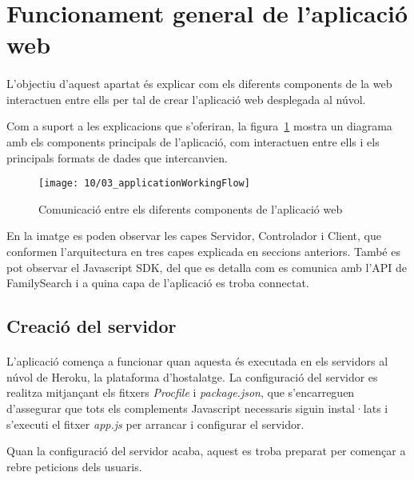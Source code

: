 \section{Funcionament general de l'aplicació web}

    \paragraph{}
    L'objectiu d'aquest apartat és explicar com els diferents components de la web interactuen entre ells per tal de crear l'aplicació web desplegada al núvol.

    Com a suport a les explicacions que s'oferiran, la figura~\ref{img:appWorkflow} mostra un diagrama amb els components principals de l'aplicació, com interactuen entre ells i els principals formats de dades que intercanvien.

    \begin{figure}
        \texttt{[image: 10/03\_applicationWorkingFlow]}
        \centering
        \caption{Comunicació entre els diferents components de l'aplicació web}\label{img:appWorkflow}
    \end{figure}

    En la imatge es poden observar les capes Servidor, Controlador i Client, que conformen l'arquitectura en tres capes explicada en seccions anteriors. També es pot observar el Javascript SDK, del que es detalla com es comunica amb l'API de FamilySearch i a quina capa de l'aplicació es troba connectat.


    \subsection{Creació del servidor}

    \paragraph{}
    L'aplicació comença a funcionar quan aquesta és executada en els servidors al núvol de Heroku, la plataforma d'hostalatge. La configuració del servidor es realitza mitjançant els fitxers \emph{Procfile} i \emph{package.json}, que s'encarreguen d'assegurar que tots els complements Javascript necessaris siguin instal·lats i s'executi el fitxer \emph{app.js} per arrancar i configurar el servidor.

    Quan la configuració del servidor acaba, aquest es troba preparat per començar a rebre peticions dels usuaris.


